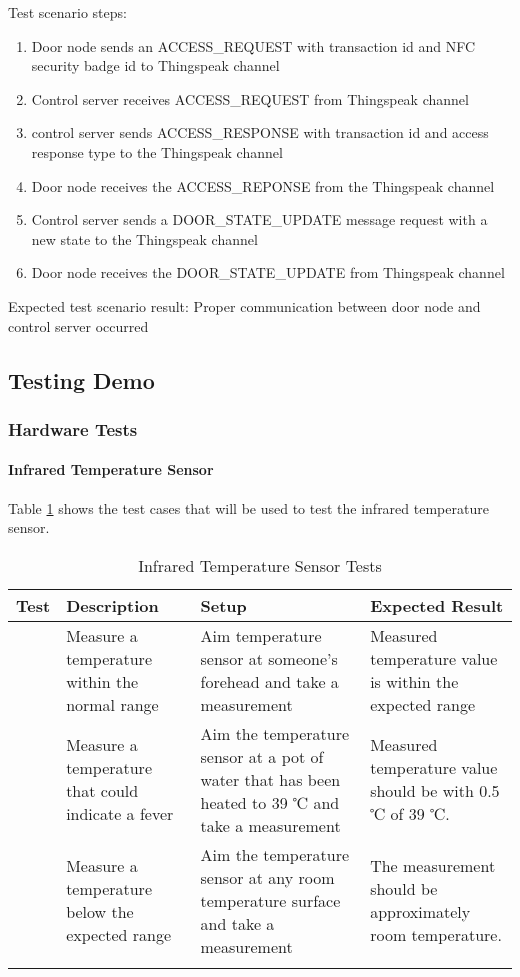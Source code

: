 \noindent
Test scenario steps:
\begin{enumerate}
    \item Door node sends an ACCESS\_REQUEST with transaction id and NFC
          security badge id to Thingspeak channel
    \item Control server receives ACCESS\_REQUEST from Thingspeak channel 
    \item control server sends ACCESS\_RESPONSE with transaction id and access
          response type to the Thingspeak channel
    \item Door node receives the ACCESS\_REPONSE from the Thingspeak channel
    \item Control server sends a DOOR\_STATE\_UPDATE message request with a new
          state to the Thingspeak channel
    \item Door node receives the DOOR\_STATE\_UPDATE from Thingspeak channel 
\end{enumerate}

\noindent
Expected test scenario result: Proper communication between door node and
control server occurred

\subsection{Testing Demo}

\subsubsection{Hardware Tests}

\paragraph{Infrared Temperature Sensor}

Table \ref{table:ir-tests} shows the test cases that will be used to test the
infrared temperature sensor.

\begin{longtable}[htb]{>{\centering\arraybackslash}m{0.75cm}|>{\centering\arraybackslash}m{4cm}|>{\centering\arraybackslash}m{4.5cm}|>{\centering\arraybackslash}m{4cm}}
\toprule
Test & Description & Setup & Expected Result \\
\midrule
1 & Measure a temperature within the normal range & Aim temperature sensor at
someone's forehead and take a measurement & Measured temperature value is within
the expected range \\
\hline
2 & Measure a temperature that could indicate a fever & Aim the temperature
sensor at a pot of water that has been heated to 39 ℃ and take a measurement &
Measured temperature value should be with 0.5 ℃ of 39 ℃. \\
\hline
3 & Measure a temperature below the expected range & Aim the temperature sensor
at any room temperature surface and take a measurement & The measurement should
be approximately room temperature. \\
\bottomrule
\caption{Infrared Temperature Sensor Tests}
\label{table:ir-tests}
\end{longtable}

